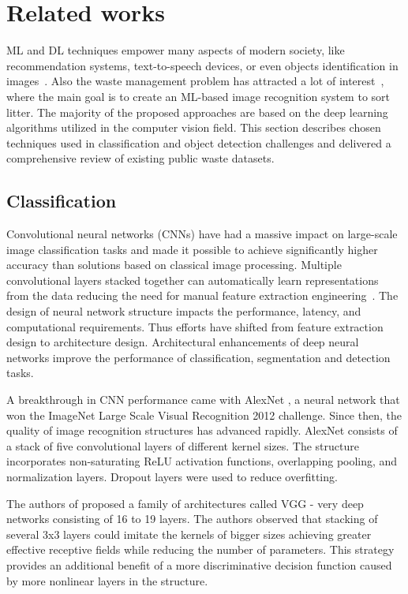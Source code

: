 \documentclass{article}
\begin{document}
\section{Related works}
\label{sec:related_works}

ML and DL techniques empower many aspects of modern society, like recommendation systems, text-to-speech devices, or even objects identification in images~\cite{lecun2015deep}. Also the waste management problem has attracted a lot of interest~\cite{white2020wastenet,Sheng2020,Glouche2013ASW}, where the main goal is to create an ML-based image recognition system to sort litter. The majority of the proposed approaches are based on the deep learning algorithms utilized in the computer vision field. This section describes chosen techniques used in classification and object detection challenges and delivered a comprehensive review of existing public waste datasets.

\subsection{Classification}
\label{sec:classification}
Convolutional neural networks (CNNs) have had a massive impact on large-scale image classification tasks and made it possible to achieve significantly higher accuracy than solutions based on classical image processing. Multiple convolutional layers stacked together can automatically learn representations from the data reducing the need for manual feature extraction engineering~\cite{lecun2015deep}. The design of neural network structure impacts the performance, latency, and computational requirements. Thus efforts have shifted from feature extraction design to architecture design. Architectural enhancements of deep neural networks improve the performance of classification, segmentation and detection tasks.

A breakthrough in CNN performance came with AlexNet \cite{NIPS2012_4824}, a neural network that won the ImageNet Large Scale Visual Recognition 2012 challenge. Since then, the quality of image recognition structures has advanced rapidly. AlexNet consists of a stack of five convolutional layers of different kernel sizes. The structure incorporates non-saturating ReLU activation functions, overlapping pooling, and normalization layers. Dropout layers were used to reduce overfitting. 

The authors of \cite{DBLP:journals/corr/SimonyanZ14a} proposed a family of architectures called VGG - very deep networks consisting of 16 to 19 layers. The authors observed that stacking of several 3x3 layers could imitate the kernels of bigger sizes achieving greater effective receptive fields while reducing the number of parameters. This strategy provides an additional benefit of a more discriminative decision function caused by more nonlinear layers in the structure.
\end{document}
